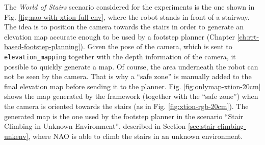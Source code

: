 The \textit{World of Stairs} scenario considered for the experiments is the one 
shown in Fig. \ref{fig:nao-with-xtion-full-env}, where the robot stands in 
front of a stairway. The idea is to position the camera towards the stairs in 
order to generate an elevation map accurate enough to be used by a footstep
planner (Chapter \ref{ch:rrt-based-footstep-planning}). Given the pose of the 
camera, which is sent to \texttt{elevation\_mapping} together with the depth 
information of the camera, it possible to quickly generate a map.
Of course, the area underneath the robot can not be seen by the camera. That is 
why a ``safe zone'' is manually added to the final elevation map before 
sending it to the planner.
Fig. \ref{fig:onlymap-xtion-20cm} shows the map generated by the framework 
(together with the ``safe zone'') when the 
camera is oriented towards the stairs (as in Fig. \ref{fig:xtion-rgb-20cm}).
The generated map is the one used by the footstep planner in the scenario 
``Stair Climbing in Unknown Environment'', described in Section
\ref{sec:stair-climbing-unkenv}, where NAO is able to climb the stairs in an 
unknown environment.

